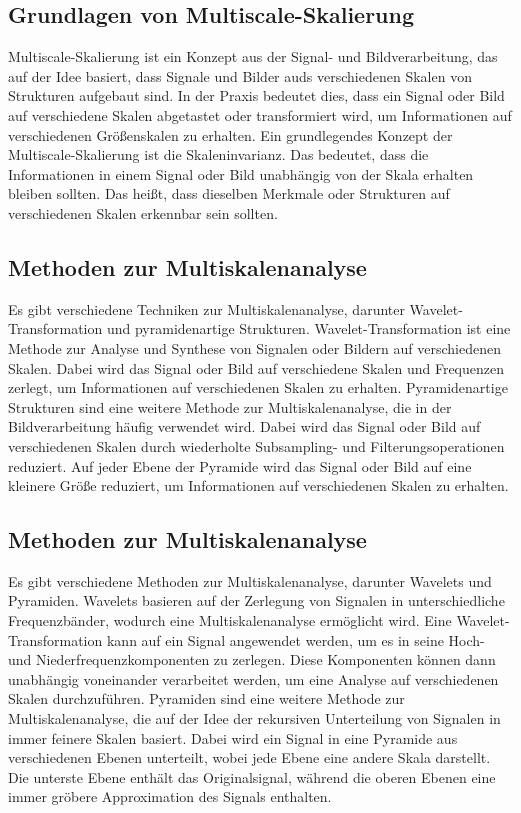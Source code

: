     \subsection{Grundlagen von Multiscale-Skalierung}
    
        Multiscale-Skalierung ist ein Konzept aus der Signal- und Bildverarbeitung, das auf der Idee basiert, dass Signale und Bilder auds verschiedenen Skalen von Strukturen aufgebaut sind.
        In der Praxis bedeutet dies, dass ein Signal oder Bild auf verschiedene Skalen abgetastet oder transformiert wird, um Informationen auf verschiedenen Größenskalen zu erhalten.
        Ein grundlegendes Konzept der Multiscale-Skalierung ist die Skaleninvarianz. Das bedeutet, dass die Informationen in einem Signal oder Bild unabhängig von der Skala erhalten bleiben sollten. Das heißt, dass dieselben Merkmale oder Strukturen auf verschiedenen Skalen erkennbar sein sollten.
    
    \subsection{Methoden zur Multiskalenanalyse}
    
        Es gibt verschiedene Techniken zur Multiskalenanalyse, darunter Wavelet-Transformation und pyramidenartige Strukturen. Wavelet-Transformation ist eine Methode zur Analyse und Synthese von Signalen oder Bildern auf verschiedenen Skalen. Dabei wird das Signal oder Bild auf verschiedene Skalen und Frequenzen zerlegt, um Informationen auf verschiedenen Skalen zu erhalten.
        Pyramidenartige Strukturen sind eine weitere Methode zur Multiskalenanalyse, die in der Bildverarbeitung häufig verwendet wird. Dabei wird das Signal oder Bild auf verschiedenen Skalen durch wiederholte Subsampling- und Filterungsoperationen reduziert. Auf jeder Ebene der Pyramide wird das Signal oder Bild auf eine kleinere Größe reduziert, um Informationen auf verschiedenen Skalen zu erhalten.
    
    \subsection{Methoden zur Multiskalenanalyse}
        Es gibt verschiedene Methoden zur Multiskalenanalyse, darunter Wavelets und Pyramiden. Wavelets basieren auf der Zerlegung von Signalen in unterschiedliche Frequenzbänder, wodurch eine Multiskalenanalyse ermöglicht wird. Eine Wavelet-Transformation kann auf ein Signal angewendet werden, um es in seine Hoch- und Niederfrequenzkomponenten zu zerlegen. Diese Komponenten können dann unabhängig voneinander verarbeitet werden, um eine Analyse auf verschiedenen Skalen durchzuführen.
        Pyramiden sind eine weitere Methode zur Multiskalenanalyse, die auf der Idee der rekursiven Unterteilung von Signalen in immer feinere Skalen basiert. Dabei wird ein Signal in eine Pyramide aus verschiedenen Ebenen unterteilt, wobei jede Ebene eine andere Skala darstellt. Die unterste Ebene enthält das Originalsignal, während die oberen Ebenen eine immer gröbere Approximation des Signals enthalten.
    
